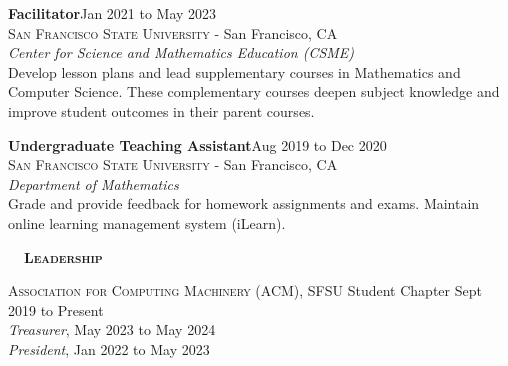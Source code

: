 \documentclass[hidelinks, 10.5pt]{article}
\def\contentwidth{0.9\linewidth}    %
\def\contentblockspacing{2.5mm}     %
\def\contentheaderspacing{1mm}      %
\def\sectionspacing{8mm}            %
\def\sectiontocontentspacing{4mm}   %
\renewcommand{\section}[1]{
    {\fontsize{14}{14}\selectfont \textsc{\textbf{\ \ #1\ \ }}}\hrulefill
}
\begin{document}
{\vspace{\contentblockspacing}

\begin{minipage}[ct]{\contentwidth}
    \textbf{Facilitator}\hfill Jan 2021 to May 2023\\
    {\textsc{San Francisco State University} - San Francisco, CA}\\
    \textit{Center for Science and Mathematics Education (CSME)}
    \vspace{\contentheaderspacing}\\
    Develop lesson plans and lead supplementary courses in Mathematics and Computer Science.  These complementary courses deepen subject
    knowledge and improve student outcomes in their parent courses.
\end{minipage}

\vspace{\contentblockspacing}

\begin{minipage}[ct]{\contentwidth}
    \textbf{Undergraduate Teaching Assistant}\hfill Aug 2019 to Dec 2020\\
    {\textsc{San Francisco State University} - San Francisco, CA}\\
    \textit{Department of Mathematics}\\
    Grade and provide feedback for homework assignments and exams.  Maintain online learning management system (iLearn).
\end{minipage}

\vspace{\sectionspacing}


\section{Leadership}

\vspace{\sectiontocontentspacing}

\begin{minipage}[ct]{\contentwidth}
    \textsc{Association for Computing Machinery} (ACM), SFSU Student Chapter\hfill
    Sept 2019 to Present\\
    \emph{Treasurer}, May 2023 to May 2024\\
    \emph{President}, Jan 2022 to May 2023
\end{minipage}

}
\end{document}
